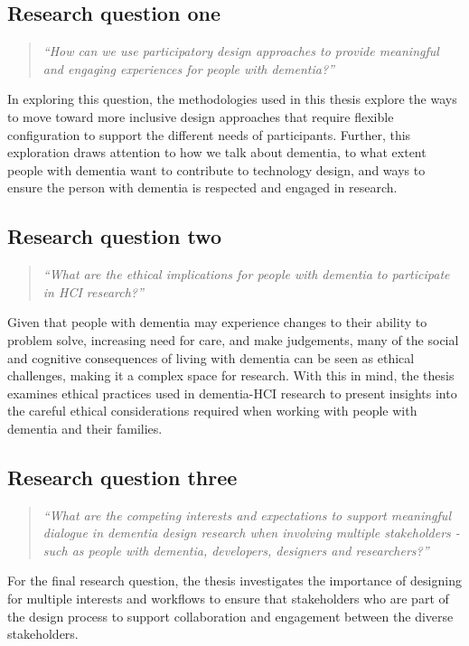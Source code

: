 \subsection{Research question one}
\label{RQ1}
\begin{quote}
\textit{``How can we use participatory design approaches to provide meaningful and engaging experiences for people with dementia?''}
\end{quote}
In exploring this question, the methodologies used in this thesis explore the ways to move toward more inclusive design approaches that require flexible configuration to support the different needs of participants. Further, this exploration draws attention to how we talk about dementia, to what extent people with dementia want to contribute to technology design, and ways to ensure the person with dementia is respected and engaged in research.

\subsection{Research question two}
\label{RQ2}
\begin{quote}
\textit{``What are the ethical implications for people with dementia to participate in HCI research?''}
\end{quote}
Given that people with dementia may experience changes to their ability to problem solve, increasing need for care, and make judgements, many of the social and cognitive consequences of living with dementia can be seen as ethical challenges, making it a complex space for research. With this in mind, the thesis examines ethical practices used in dementia-HCI research to present insights into the careful ethical considerations required when working with people with dementia and their families. 

\subsection{Research question three}
\label{RQ3}
\begin{quote}
\textit{``What are the competing interests and expectations to support meaningful dialogue in dementia design research when involving multiple stakeholders - such as people with dementia, developers, designers and researchers?''}
\end{quote}
For the final research question, the thesis investigates the importance of designing for multiple interests and workflows to ensure that stakeholders who are part of the design process to support collaboration and engagement between the diverse stakeholders. 

